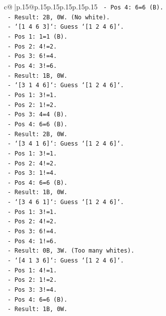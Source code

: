 \documentclass{article}
\begin{document}
{\begin{supertabular}{c@{$\;$}|p{.15\linewidth}@{}p{.15\linewidth}p{.15\linewidth}p{.15\linewidth}p{.15\linewidth}p{.15\linewidth}}
{{{\texttt{        {-} Pos 4: 6=6 (B).} \\
\texttt{        {-} Result: 2B, 0W. (No white).} \\
\texttt{    {-} `{[}1 4 6 3{]}`: Guess `{[}1 2 4 6{]}`.} \\
\texttt{        {-} Pos 1: 1=1 (B).} \\
\texttt{        {-} Pos 2: 4!=2.} \\
\texttt{        {-} Pos 3: 6!=4.} \\
\texttt{        {-} Pos 4: 3!=6.} \\
\texttt{        {-} Result: 1B, 0W.} \\
\texttt{    {-} `{[}3 1 4 6{]}`: Guess `{[}1 2 4 6{]}`.} \\
\texttt{        {-} Pos 1: 3!=1.} \\
\texttt{        {-} Pos 2: 1!=2.} \\
\texttt{        {-} Pos 3: 4=4 (B).} \\
\texttt{        {-} Pos 4: 6=6 (B).} \\
\texttt{        {-} Result: 2B, 0W.} \\
\texttt{    {-} `{[}3 4 1 6{]}`: Guess `{[}1 2 4 6{]}`.} \\
\texttt{        {-} Pos 1: 3!=1.} \\
\texttt{        {-} Pos 2: 4!=2.} \\
\texttt{        {-} Pos 3: 1!=4.} \\
\texttt{        {-} Pos 4: 6=6 (B).} \\
\texttt{        {-} Result: 1B, 0W.} \\
\texttt{    {-} `{[}3 4 6 1{]}`: Guess `{[}1 2 4 6{]}`.} \\
\texttt{        {-} Pos 1: 3!=1.} \\
\texttt{        {-} Pos 2: 4!=2.} \\
\texttt{        {-} Pos 3: 6!=4.} \\
\texttt{        {-} Pos 4: 1!=6.} \\
\texttt{        {-} Result: 0B, 3W. (Too many whites).} \\
\texttt{    {-} `{[}4 1 3 6{]}`: Guess `{[}1 2 4 6{]}`.} \\
\texttt{        {-} Pos 1: 4!=1.} \\
\texttt{        {-} Pos 2: 1!=2.} \\
\texttt{        {-} Pos 3: 3!=4.} \\
\texttt{        {-} Pos 4: 6=6 (B).} \\
\texttt{        {-} Result: 1B, 0W.} \\
}}}
\end{supertabular}}
\end{document}
